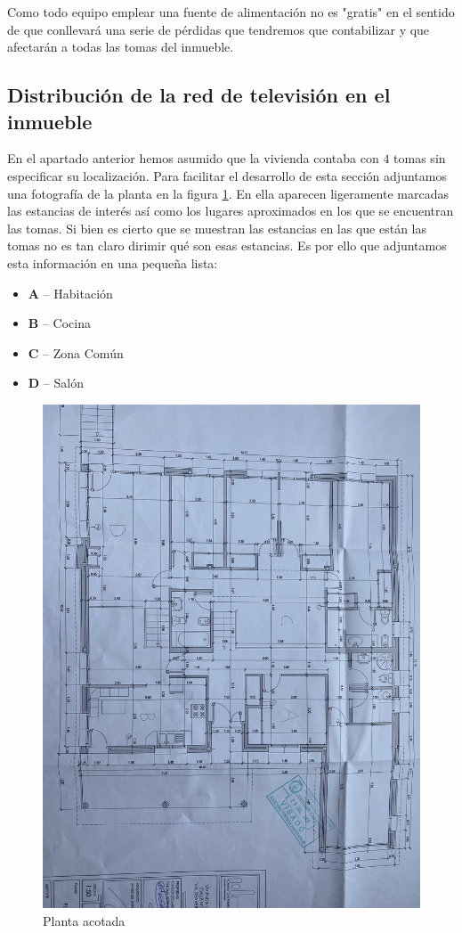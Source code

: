 \documentclass{article}[12 pt]
\begin{document}
			Como todo equipo emplear una fuente de alimentación no es "gratis" en el sentido de que conllevará una serie de pérdidas que tendremos que contabilizar y que afectarán a todas las tomas del inmueble.\\

		\subsection{Distribución de la red de televisión en el inmueble}
			En el apartado anterior hemos asumido que la vivienda contaba con $4$ tomas sin especificar su localización. Para facilitar el desarrollo de esta sección adjuntamos una fotografía de la planta en la figura \ref{f:p_acotada}. En ella aparecen ligeramente marcadas las estancias de interés así como los lugares aproximados en los que se encuentran las tomas. Si bien es cierto que se muestran las estancias en las que están las tomas no es tan claro dirimir qué son esas estancias. Es por ello que adjuntamos esta información en una pequeña lista:

			\begin{itemize}
				\item \textbf{A} -- Habitación
				\item \textbf{B} -- Cocina
				\item \textbf{C} -- Zona Común
				\item \textbf{D} -- Salón
			\end{itemize}

			\begin{figure}
				\centering
				\includegraphics[width=0.8\linewidth]{planta_acotada.jpg}
				\caption{Planta acotada}
				\label{f:p_acotada}
			\end{figure}
\end{document}
